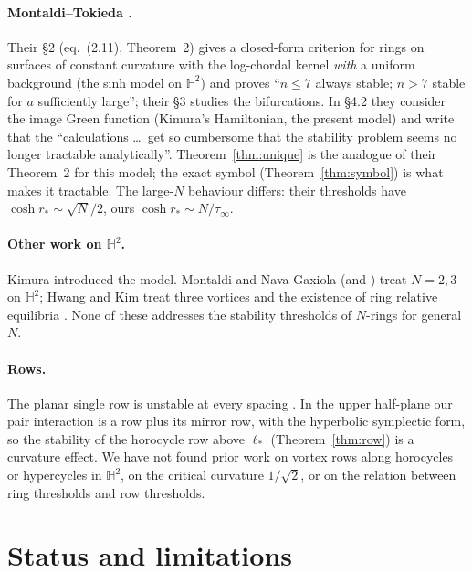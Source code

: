 \documentclass[11pt]{article}
\theoremstyle{definition}
\theoremstyle{remark}
\newcommand{\HH}{\mathbb H^2}
\begin{document}
\paragraph{Montaldi--Tokieda \cite{MontaldiTokieda2013}.} Their \S2 (eq.~(2.11), Theorem~2) gives a closed-form criterion for rings on
surfaces of constant curvature with the log-chordal kernel \emph{with} a uniform background (the sinh model on $\HH$) and proves ``$n\le7$
always stable; $n>7$ stable for $a$ sufficiently large''; their \S3 studies the bifurcations. In \S4.2 they consider the image Green
function (Kimura's Hamiltonian, the present model) and write that the ``calculations \dots\ get so cumbersome that the stability problem
seems no longer tractable analytically''. Theorem~\ref{thm:unique} is the analogue of their Theorem~2 for this model; the exact symbol
(Theorem~\ref{thm:symbol}) is what makes it tractable. The large-$N$ behaviour differs: their thresholds have $\cosh r_*\sim\sqrt N/2$, ours
$\cosh r_*\sim N/\tau_\infty$.

\paragraph{Other work on $\HH$.} Kimura \cite{Kimura1999} introduced the model. Montaldi and Nava-Gaxiola \cite{MontaldiNavaGaxiola2014}
(and \cite{NavaGaxiola2013}) treat $N=2,3$ on $\HH$; Hwang and Kim treat three vortices \cite{HwangKim2009} and the existence of ring
relative equilibria \cite{HwangKim2013}. None of these addresses the stability thresholds of $N$-rings for general $N$.

\paragraph{Rows.} The planar single row is unstable at every spacing \cite{vonKarman1912,Lamb1932,Aref1995}. In the upper half-plane
our pair interaction is a row plus its mirror row, with the hyperbolic symplectic form, so the stability of the horocycle row above
$\ell_*$ (Theorem~\ref{thm:row}) is a curvature effect. We have not found prior work on vortex rows along horocycles or hypercycles in
$\HH$, on the critical curvature $1/\sqrt2$, or on the relation between ring thresholds and row thresholds.

\section{Status and limitations}\label{sec:status}
\end{document}
